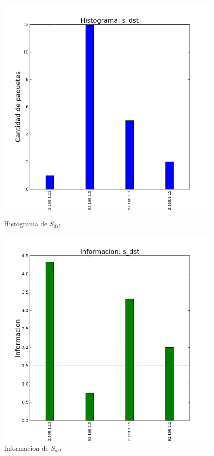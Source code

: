 \begin{figure}[H]
  \begin{minipage}{0.5\linewidth}
    \includegraphics[width=\linewidth]{../imgs/pruebaFede-ips_s_dst_hist.png}
    \caption{Histograma de $S_{dst}$}\label{fig:Fede-dst-hist}
  \end{minipage}
\hfill
  \begin{minipage}{0.5\linewidth}
    \includegraphics[width=\linewidth]{../imgs/pruebaFede-ips_s_dst_info.png}
    \caption{Informacion de $S_{dst}$}\label{fig:Fede-dst-info}
  \end{minipage}
\end{figure}

